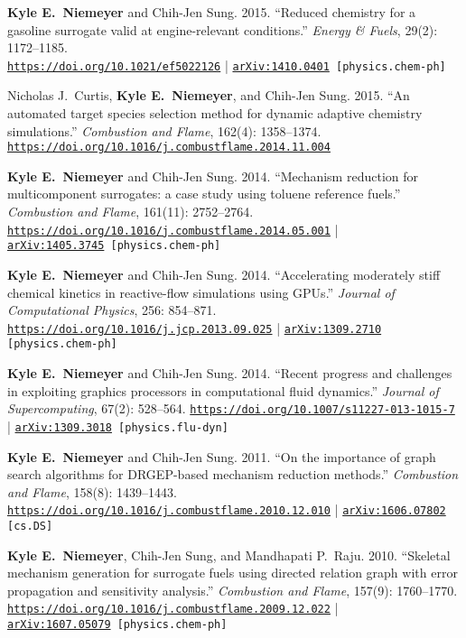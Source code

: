\documentclass[margin,line,11pt]{res}
\makeatletter
\newlength{\bibhang}
\newlength{\bibsep}
 {\@listi \global\bibsep\itemsep \global\advance\bibsep by\parsep}
\newenvironment{bibenum*}
  {\renewcommand\labelenumi{\theenumi.}%
   \etaremune[
     topsep=0pt,
     itemsep=\bibsep,
     parsep=0pt,partopsep=0pt,
     itemindent=-\bibhang,
     leftmargin={\bibhang+\widthof{[999]}}]}
  {\endetaremune}
\newcommand*{\doi}[1]{\href{https://doi.org/#1}{\nolinkurl{https://doi.org/#1}}}
\makeatother
\begin{document}
\begin{resume}
\begin{bibenum*}
\item \textbf{Kyle E.~Niemeyer} and Chih-Jen Sung.
2015.
``Reduced chemistry for a gasoline surrogate valid at engine-relevant conditions.''
\emph{Energy \& Fuels}, 29(2): 1172--1185. \\
\doi{10.1021/ef5022126} |
{\tt \href{http://arxiv.org/abs/1410.0401}{arXiv:1410.0401} [physics.chem-ph]}

\item Nicholas J.\ Curtis, \textbf{Kyle E.~Niemeyer}, and Chih-Jen Sung.
2015.
``An automated target species selection method for dynamic adaptive chemistry simulations.''
\emph{Combustion and Flame}, 162(4): 1358--1374.
\doi{10.1016/j.combustflame.2014.11.004}

\item \textbf{Kyle E.~Niemeyer} and Chih-Jen Sung.
2014.
``Mechanism reduction for multicomponent surrogates: a case study using toluene reference fuels.''
\emph{Combustion and Flame}, 161(11): 2752--2764.
\doi{10.1016/j.combustflame.2014.05.001} | \\
{\tt \href{http://arxiv.org/abs/1405.3745}{arXiv:1405.3745} [physics.chem-ph]}

\item \textbf{Kyle E.~Niemeyer} and Chih-Jen Sung.
2014.
``Accelerating moderately stiff chemical kinetics in reactive-flow simulations using GPUs.''
\emph{Journal of Computational Physics}, 256: 854--871. \\
\doi{10.1016/j.jcp.2013.09.025} |
{\tt \href{http://arxiv.org/abs/1309.2710}{arXiv:1309.2710} [physics.chem-ph]}

\item \textbf{Kyle E.~Niemeyer} and Chih-Jen Sung.
2014.
``Recent progress and challenges in exploiting graphics processors in computational fluid dynamics.''
\emph{Journal of Supercomputing}, 67(2): 528--564.
\doi{10.1007/s11227-013-1015-7} |
{\tt \href{http://arxiv.org/abs/1309.3018}{arXiv:1309.3018} [physics.flu-dyn]}

\item \textbf{Kyle E.~Niemeyer} and Chih-Jen Sung.
2011.
``On the importance of graph search algorithms for DRGEP-based mechanism reduction methods.''
\emph{Combustion and Flame}, 158(8): 1439--1443.
\doi{10.1016/j.combustflame.2010.12.010} |
{\tt \href{http://arxiv.org/abs/1606.07802}{arXiv:1606.07802} [cs.DS]}

\item \textbf{Kyle E.~Niemeyer}, Chih-Jen Sung, and Mandhapati P.\ Raju.
2010.
``Skeletal mechanism generation for surrogate fuels using directed relation graph with error propagation and sensitivity analysis.''
\emph{Combustion and Flame}, 157(9): 1760--1770. \\
\doi{10.1016/j.combustflame.2009.12.022} | \\
{\tt \href{http://arxiv.org/abs/1607.05079}{arXiv:1607.05079} [physics.chem-ph]}


\end{bibenum*}
\end{resume}
\end{document}
